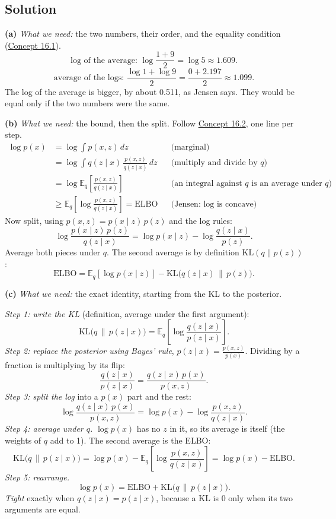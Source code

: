 \documentclass[12pt,a4paper]{article}
\begin{document}
\subsection{Solution}

\textbf{(a)} \emph{What we need:} the two numbers, their order, and the equality condition (\hyperref[c16-1]{Concept 16.1}).
\[
\text{log of the average: }\log\frac{1+9}{2}=\log5\approx1.609 .
\]
\[
\text{average of the logs: }\frac{\log1+\log9}{2}=\frac{0+2.197}{2}\approx1.099 .
\]
The log of the average is bigger, by about 0.511, as Jensen says. They would be equal only if the two numbers were the same.

\textbf{(b)} \emph{What we need:} the bound, then the split. Follow \hyperref[c16-2]{Concept 16.2}, one line per step.
\begin{align*}
\log p(x)&=\log\int p(x,z)\,dz &&\text{(marginal)}\\
&=\log\int q(z\mid x)\,\frac{p(x,z)}{q(z\mid x)}\,dz &&\text{(multiply and divide by }q\text{)}\\
&=\log\mathbb{E}_q\!\left[\frac{p(x,z)}{q(z\mid x)}\right] &&\text{(an integral against }q\text{ is an average under }q\text{)}\\
&\ge\mathbb{E}_q\!\left[\log\frac{p(x,z)}{q(z\mid x)}\right]=\text{ELBO} &&\text{(Jensen: log is concave)}
\end{align*}
Now split, using $p(x,z)=p(x\mid z)\,p(z)$ and the log rules:
\[
\log\frac{p(x\mid z)\,p(z)}{q(z\mid x)}=\log p(x\mid z)-\log\frac{q(z\mid x)}{p(z)} .
\]
Average both pieces under $q$. The second average is by definition $\mathrm{KL}(q\|p(z))$:
\[
\text{ELBO}=\mathbb{E}_q[\log p(x\mid z)]-\mathrm{KL}\big(q(z\mid x)\,\|\,p(z)\big).
\]

\textbf{(c)} \emph{What we need:} the exact identity, starting from the KL to the posterior.

\emph{Step 1: write the KL} (definition, average under the first argument):
\[
\mathrm{KL}\big(q\,\|\,p(z\mid x)\big)=\mathbb{E}_q\!\left[\log\frac{q(z\mid x)}{p(z\mid x)}\right].
\]
\emph{Step 2: replace the posterior using Bayes' rule}, $p(z\mid x)=\frac{p(x,z)}{p(x)}$. Dividing by a fraction is multiplying by its flip:
\[
\frac{q(z\mid x)}{p(z\mid x)}=\frac{q(z\mid x)\,p(x)}{p(x,z)} .
\]
\emph{Step 3: split the log} into a $p(x)$ part and the rest:
\[
\log\frac{q(z\mid x)\,p(x)}{p(x,z)}=\log p(x)-\log\frac{p(x,z)}{q(z\mid x)} .
\]
\emph{Step 4: average under $q$.} $\log p(x)$ has no $z$ in it, so its average is itself (the weights of $q$ add to 1). The second average is the ELBO:
\[
\mathrm{KL}\big(q\,\|\,p(z\mid x)\big)=\log p(x)-\mathbb{E}_q\!\left[\log\frac{p(x,z)}{q(z\mid x)}\right]=\log p(x)-\text{ELBO}.
\]
\emph{Step 5: rearrange.}
\[
\log p(x)=\text{ELBO}+\mathrm{KL}\big(q\,\|\,p(z\mid x)\big).
\]
\emph{Tight} exactly when $q(z\mid x)=p(z\mid x)$, because a KL is 0 only when its two arguments are equal.
\end{document}
